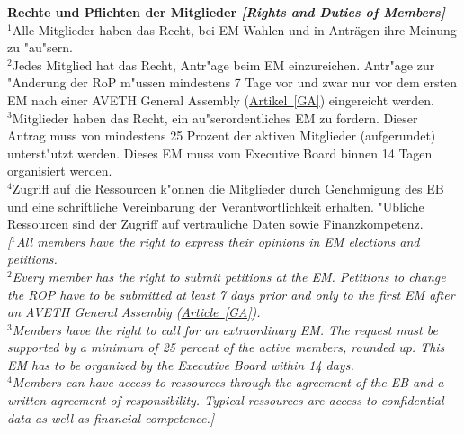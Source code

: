 \documentclass[10pt]{article}
\newcounter{qcounter}
\begin{document}
\begin{list}{{\bf Artikel :~}}{}
\item {\bf Rechte und Pflichten der Mitglieder {\it[Rights and Duties of Members]}}\label{Duties}\\
$^{1}$Alle Mitglieder haben das Recht, bei EM-Wahlen und in Anträgen ihre Meinung zu "au"sern. \\
$^{2}$Jedes Mitglied hat das Recht, Antr"age beim EM einzureichen. Antr"age zur "Anderung der RoP m"ussen mindestens 7 Tage vor und zwar nur vor dem ersten EM nach einer AVETH General Assembly (\hyperref[GA]{Artikel~\ref{GA}}) eingereicht werden.\\
$^{3}$Mitglieder haben das Recht, ein au"serordentliches EM zu fordern. Dieser Antrag muss von mindestens 25 Prozent der aktiven Mitglieder (aufgerundet) unterst"utzt werden. Dieses EM muss vom Executive Board binnen 14 Tagen organisiert werden.\\
$^{4}$Zugriff auf die Ressourcen k"onnen die Mitglieder durch Genehmigung des EB und eine schriftliche
Vereinbarung der Verantwortlichkeit erhalten. "Ubliche Ressourcen sind der Zugriff auf vertrauliche Daten sowie Finanzkompetenz.\\
{\it[$^{1}$All members have the right to express their opinions in EM elections and petitions.\\
$^{2}$Every member has the right to submit petitions at the EM. Petitions to change the ROP have to be submitted at least 7 days prior and only to the first EM after an AVETH General Assembly (\hyperref[GA]{Article~\ref{GA}}).\\
$^{3}$Members have the right to call for an extraordinary EM. The request must be supported by a minimum of 25 percent of the active members, rounded up. This EM has to be organized by the Executive Board within 14 days.\\
$^{4}$Members can have access to ressources through the agreement of the EB and a written agreement of responsibility. Typical ressources are access to confidential data as well as financial competence.]}


\end{list}
\end{document}
